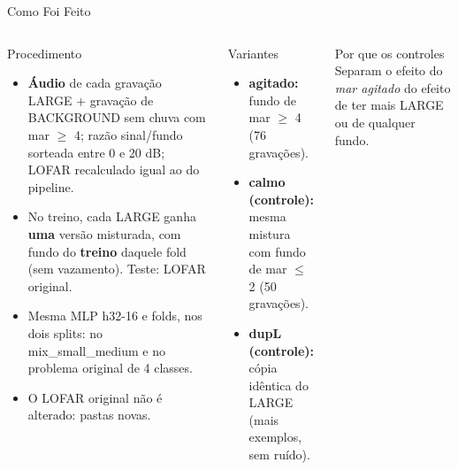 \documentclass[aspectratio=169]{beamer}
\begin{document}
\begin{frame}{Como Foi Feito}
    \footnotesize
    \begin{columns}[t]
        \begin{block}{\small Procedimento}
            \scriptsize
            \begin{itemize}
                \setlength{\itemsep}{2pt}
                \item \textbf{Áudio} de cada gravação LARGE + gravação de BACKGROUND sem chuva com mar $\geq$ 4; razão sinal/fundo sorteada entre 0 e 20 dB; LOFAR recalculado igual ao do pipeline.
                \item No treino, cada LARGE ganha \textbf{uma} versão misturada, com fundo do \textbf{treino} daquele fold (sem vazamento). Teste: LOFAR original.
                \item Mesma MLP h32-16 e folds, nos dois splits: no mix\_small\_medium e no problema original de 4 classes.
                \item O LOFAR original não é alterado: pastas novas.
            \end{itemize}
        \end{block}
        \begin{block}{\small Variantes}
            \scriptsize
            \begin{itemize}
                \setlength{\itemsep}{2pt}
                \item \textbf{agitado:} fundo de mar $\geq$ 4 (76 gravações).
                \item \textbf{calmo (controle):} mesma mistura com fundo de mar $\leq$ 2 (50 gravações).
                \item \textbf{dupL (controle):} cópia idêntica do LARGE (mais exemplos, sem ruído).
            \end{itemize}
        \end{block}
        \begin{alertblock}{\small Por que os controles}
            \scriptsize
            Separam o efeito do \emph{mar agitado} do efeito de ter mais LARGE ou de qualquer fundo.
        \end{alertblock}
    \end{columns}
\end{frame}
\end{document}

